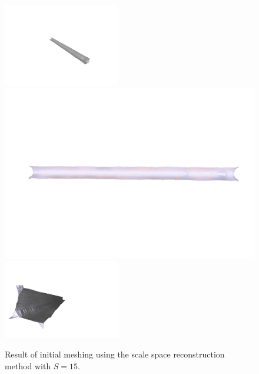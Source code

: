 \documentclass[12pt]{drexelthesis}
\begin{document}
\begin{figure}[!h]
	\label{zeronoise:scalespace15}
	\centering
		\includegraphics[trim={5in 2in 3in 3in},clip,width=2in]{simulated-lab-scan/0noise/clean/scalespace1500.png}
		\includegraphics[width=6in]{simulated-lab-scan/0noise/clean/scalespace1501.png}
		\includegraphics[trim={1in 1in 2in 2in}, clip, width=2in]{simulated-lab-scan/0noise/clean/scalespace1502.png}
		\caption[Initial meshing using a scale space reconstruction with $S = 15$]{\centering  Result of initial meshing using the scale space reconstruction method with $S = 15$.}
\end{figure}
\end{document}

